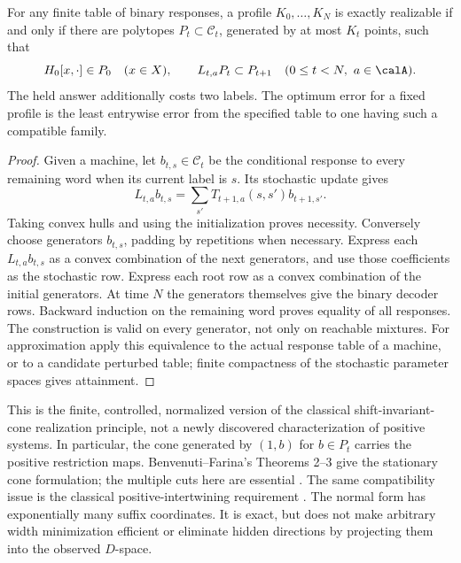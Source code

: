 \begin{proposition}\label{prop:hankel-form}
For any finite table of binary responses, a profile $K_0,\ldots,K_N$
is exactly realizable if and only if there are polytopes
$P_t\subset\mathcal C_t$, generated by at most $K_t$ points, such that
\begin{equation}\label{eq:compatible-hankel}
 H_0[x,\cdot]\in P_0\quad(x\in X),\qquad
 L_{t,a}P_t\subset P_{t+1}\quad(0\le t<N,\ a\in\calA).
\end{equation}
The held answer additionally costs two labels. The optimum error for a
fixed profile is the least entrywise error from the specified table to
one having such a compatible family.
\end{proposition}
\begin{proof}
Given a machine, let $b_{t,s}\in\mathcal C_t$ be the conditional response
to every remaining word when its current label is $s$. Its stochastic
update gives
\[
 L_{t,a}b_{t,s}=\sum_{s'}T_{t+1,a}(s,s')b_{t+1,s'}.
\]
Taking convex hulls and using the initialization proves necessity.
Conversely choose generators $b_{t,s}$, padding by repetitions when
necessary. Express each $L_{t,a}b_{t,s}$ as a convex combination of the
next generators, and use those coefficients as the stochastic row.
Express each root row as a convex combination of the initial generators.
At time $N$ the generators themselves give the binary decoder rows.
Backward induction on the remaining word proves equality of all
responses. The construction is valid on every generator, not only on
reachable mixtures. For approximation apply this equivalence to the
actual response table of a machine, or to a candidate perturbed table;
finite compactness of the stochastic parameter spaces gives attainment.
\end{proof}

This is the finite, controlled, normalized version of the classical
shift-invariant-cone realization principle, not a newly discovered
characterization of positive systems. In particular, the cone generated
by $(1,b)$ for $b\in P_t$ carries the positive restriction maps.
Benvenuti--Farina's Theorems 2--3 give the stationary cone formulation;
the multiple cuts here are essential \cite{BF04}. The same compatibility
issue is the classical positive-intertwining requirement \cite{BF03,BF04}.
The normal form has exponentially many suffix coordinates. It is exact,
but does not make arbitrary width minimization efficient or eliminate
hidden directions by projecting them into the observed $D$-space.

